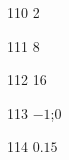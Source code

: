 \begin{loigiaibt}{110}
 2
\end{loigiaibt}
\begin{loigiaibt}{111}
 8
\end{loigiaibt}
\begin{loigiaibt}{112}
 16
\end{loigiaibt}
\begin{loigiaibt}{113}
 $-1$;$0$
\end{loigiaibt}
\begin{loigiaibt}{114}
 $0.15$
\end{loigiaibt}

